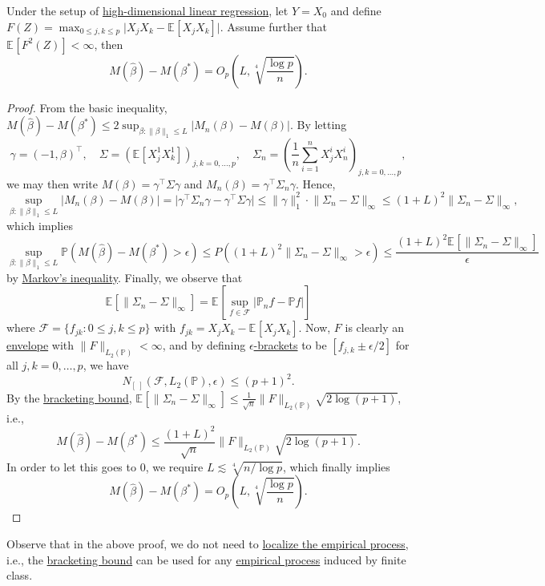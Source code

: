 \begin{theorem}\label{thm:lec22}
	Under the setup of \hyperref[eg:high-dim-LR]{high-dimensional linear regression}, let \(Y = X_0\) and define \(F(Z) = \max _{0 \leq j, k \leq p} \vert X_j X_k - \mathbb{E}_{}\left[X_j X_k \right] \vert \). Assume further that \(\mathbb{E}_{}\left[F^2(Z) \right] < \infty \), then
	\[
		M(\hat{\beta} ) - M(\beta ^{\ast} ) = O_p \left( L , \sqrt[4]{\frac{\log p}{n}} \right).
	\]
\end{theorem}
\begin{proof}
	From the basic inequality, \(M(\hat{\beta} ) - M(\beta ^{\ast} ) \leq 2 \sup _{\beta \colon \lVert \beta  \rVert _1 \leq L} \vert M_n(\beta ) - M(\beta ) \vert \). By letting
	\[
		\gamma = (-1, \beta )^{\top},\quad
		\Sigma = \left( \mathbb{E}_{}\left[X_j^1 X_k^1 \right] \right) _{j, k = 0, \dots , p},\quad
		\Sigma _n = \left( \frac{1}{n} \sum_{i=1}^{n} X_j^i X_n^i \right)_{j, k = 0, \dots , p} ,
	\]
	we may then write \(M(\beta ) = \gamma ^{\top} \Sigma \gamma\) and \(M_n(\beta ) = \gamma ^{\top} \Sigma _n \gamma\). Hence,
	\[
		\sup _{\beta \colon \lVert \beta  \rVert _1 \leq L} \vert M_n(\beta ) - M(\beta ) \vert
		= \vert \gamma ^{\top} \Sigma _n \gamma - \gamma ^{\top} \Sigma \gamma  \vert
		\leq \lVert \gamma  \rVert _1^2 \cdot \lVert \Sigma _n - \Sigma  \rVert _\infty
		\leq (1 + L)^2 \lVert \Sigma _n - \Sigma  \rVert _\infty ,
	\]
	which implies
	\[
		\sup _{\beta \colon \lVert \beta  \rVert _1 \leq L} \mathbb{P} (M(\hat{\beta} ) - M(\beta ^{\ast} ) > \epsilon )
		\leq P((1 + L)^2 \lVert \Sigma _n - \Sigma  \rVert _\infty > \epsilon )
		\leq \frac{(1 + L)^2 \mathbb{E}_{}\left[\lVert \Sigma _n - \Sigma  \rVert _\infty  \right] }{\epsilon }
	\]
	by \hyperref[lma:Markov-inequality]{Markov's inequality}. Finally, we observe that
	\[
		\mathbb{E}_{}\left[\lVert \Sigma _n - \Sigma  \rVert _\infty  \right]
		= \mathbb{E}_{}\left[\sup _{f\in \mathscr{F} } \vert \mathbb{P} _n f - \mathbb{P} f \vert  \right]
	\]
	where \(\mathscr{F} = \{ f_{jk} \colon 0 \leq j, k \leq p\} \) with \(f_{jk} = X_j X_k - \mathbb{E}_{}\left[X_j X_k \right] \). Now, \(F\) is clearly an \hyperref[def:envelope]{envelope} with \(\lVert F \rVert _{L_2(\mathbb{P} )} < \infty \), and by defining \hyperref[def:eps-bracket]{\(\epsilon\)-brackets} to be \([f_{j,k} \pm \epsilon / 2 ]\) for all \(j, k = 0, \dots , p\), we have
	\[
		N_{[\ ]}(\mathscr{F} , L_2(\mathbb{P} ), \epsilon ) \leq (p + 1) ^2.
	\]
	By the \hyperref[thm:bracketing-bound]{bracketing bound}, \(\mathbb{E}_{}\left[\lVert \Sigma _n - \Sigma  \rVert _\infty  \right] \leq \frac{1}{\sqrt{n} } \lVert F \rVert _{L_2(\mathbb{P} )} \sqrt{2 \log (p+1)} \), i.e.,
	\[
		M(\hat{\beta} ) - M(\beta ^{\ast} )
		\leq \frac{(1 + L)^2 }{\sqrt{n} } \lVert F \rVert _{L_2(\mathbb{P} )} \sqrt{2 \log (p + 1)} .
	\]
	In order to let this goes to \(0\), we require \(L \lesssim \sqrt[4]{n / \log p}\), which finally implies
	\[
		M(\hat{\beta} ) - M(\beta ^{\ast} ) = O_p \left( L, \sqrt[4]{\frac{\log p}{n}} \right).
	\]
\end{proof}

\begin{remark}
	Observe that in the above proof, we do not need to \hyperref[def:localized-EP]{localize the empirical process}, i.e., the \hyperref[thm:bracketing-bound]{bracketing bound} can be used for any \hyperref[def:EP]{empirical process} induced by finite class.
\end{remark}
